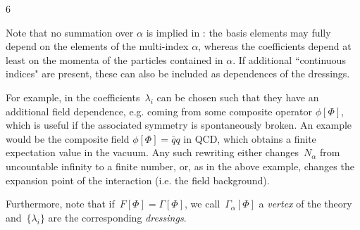 6\documentclass[10pt,prd,nofootinbib,superscriptaddress,twocolumn]{revtex4-2}
\begin{document}
Note that no summation over $\alpha$ is implied in : the basis elements may fully depend on the elements of the multi-index $\alpha$, whereas the coefficients depend at least on the momenta of the particles  contained in $\alpha$.
If additional ``continuous indices" are present, these can also be included as dependences of the dressings. 

For example, in  the coefficients~$\lambda_i$ can be chosen such that they have an additional field dependence, e.g. coming from some composite operator $\phi[\Phi]$, which is useful if the associated symmetry is spontaneously broken. 
An example would be the composite field $\phi[\Phi] = \bar q q$ in QCD, which obtains a finite expectation value in the vacuum.
Any such rewriting either changes~$N_\alpha$ from uncountable infinity to a finite number, or, as in the above example, changes the expansion point of the interaction (i.e. the field background).

Furthermore, note that if~$F[\Phi] = \Gamma[\Phi]$, we call~$\Gamma_\alpha[\Phi]$ a \textit{vertex} of the theory and~$\{\lambda_i\}$ are the corresponding \textit{dressings}.

\newpage

\end{document}
